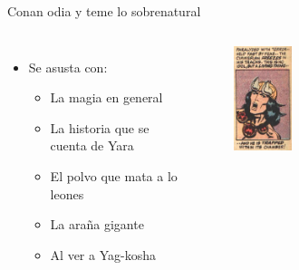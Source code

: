 \begin{frame}{Conan odia y teme lo sobrenatural}
\begin{columns}
 \begin{itemize}
    \item Se asusta con:
    \begin{itemize}
      \item La magia en general
      \item La historia que se cuenta de Yara
      \item El polvo que mata a lo leones
      \item La araña gigante
      \item Al ver a Yag-kosha
    \end{itemize}
 \end{itemize}
 \begin{figure}[htb]
    \centering
    \includegraphics[width=0.3\textwidth]{img/tropes/temor}
 \end{figure}
 \end{columns}
\end{frame}

